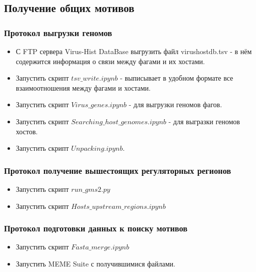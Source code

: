 \documentclass[14pt]{extarticle}
\begin{document}
\begin{center}
      \item \subsection{Получение общих мотивов}
      \item  \subsubsection{Протокол выгрузки геномов}
\end{center}
    \begin{itemize}
        \item С FTP сервера Virus-Hist DataBase выгрузить файл virushostdb.tsv - в нём содержится информация о связи 
        между фагами и их хостами.
    
        \item Запустить скрипт \(tsv\_write.ipynb\) - выписывает в удобном формате все взаимоотношения между фагами и 
        хостами.
    
      \item Запустить скрипт \(Virus\_genes.ipynb\) - для выгрузки геномов фагов.
        \item Запустить скрипт \(Searching\_host\_genomes.ipynb\) - для выгразки геномов хостов.
        \item Запустить скрипт \(Unpacking.ipynb\).

    \end{itemize}

    \begin{center}
    \item \subsubsection{Протокол получение вышестоящих регуляторных регионов}
    \end{center}
        \begin{itemize}
            \item Запустить скрипт \(run\_gms2.py\)
            \item Запустить скрипт \(Hosts\_upstream\_regions.ipynb\)
        \end{itemize}
    \begin{center}
    \item \subsubsection{Протокол подготовки данных к поиску мотивов}
    \end{center}
        \begin{itemize}
            \item Запустить скрипт \(Fasta\_merge.ipynb\)
            \item Запустить MEME Suite с получившимися файлами.
        \end{itemize}
\end{document}
